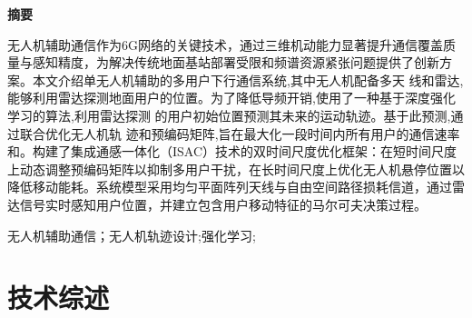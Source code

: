 \documentclass{article}
\begin{document}



\title{\TITLE}
\date{}
\maketitle

\thispagestyle{empty}

\begin{center}
  {\heititext{}\bfseries 摘要}  %
\end{center}
\vspace{0.5em}
{
    \simsuntext{}\linespread{1.5}\selectfont
    \hspace{2em}无人机辅助通信作为6G网络的关键技术，通过三维机动能力显著提升通信覆盖质量与感知精度，为解决传统地面基站部署受限和频谱资源紧张问题提供了创新方案。本文介绍单无人机辅助的多用户下行通信系统,其中无人机配备多天  线和雷达,能够利用雷达探测地面用户的位置。为了降低导频开销,使用了一种基于深度强化学习的算法,利用雷达探测  的用户初始位置预测其未来的运动轨迹。基于此预测,通过联合优化无人机轨  迹和预编码矩阵,旨在最大化一段时间内所有用户的通信速率和。构建了集成通感一体化（ISAC）技术的双时间尺度优化框架：在短时间尺度上动态调整预编码矩阵以抑制多用户干扰，在长时间尺度上优化无人机悬停位置以降低移动能耗。系统模型采用均匀平面阵列天线与自由空间路径损耗信道，通过雷达信号实时感知用户位置，并建立包含用户移动特征的马尔可夫决策过程。
    \par  %
    \vspace{0.5em}
     \simsuntext{}无人机辅助通信；无人机轨迹设计;强化学习;
}


\newpage
\pagestyle{plain}
\tableofcontents


\newpage
\pagestyle{fancy}
\fancyhf{}               %
\renewcommand{\headrulewidth}{0pt} %
 \setcounter{page}{1} %

\section{技术综述}
\end{document}
